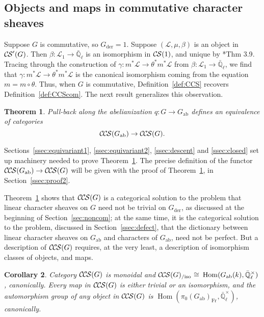 \documentclass[10pt]{amsart}
\theoremstyle{plain}
\newtheorem{theorem}{Theorem}[section]
\newtheorem{corollary}[theorem]{Corollary}
\theoremstyle{definition}
\newcommand{\EE}{\mathbb{\bar Q}_\ell}
\newcommand{\Fq}{k}
\newcommand{\EEx}{\EE^\times}
\newcommand{\Frob}[1]{\operatorname{Fr}_{#1}}
\DeclareMathOperator{\Hom}{Hom}
\newcommand{\der}{_{\operatorname{der}}}
\newcommand{\ab}{_{\operatorname{ab}}}
\newcommand{\iso}{{\ \cong\ }}
\newcommand{\cs}[1]{{\mathcal{#1}}}
\newcommand{\CS}{{\mathcal{C\hskip-0.8pt S}}}
\newcommand{\CCS}{{\mathcal{C\hskip-.8pt C\hskip-0.8pt S}}}
\newcommand{\CCSiso}[1]{\CCS(#1)_{/\text{iso}}}
\begin{document}
\subsection{Objects and maps in commutative character sheaves} \label{ssec:obmor}

Suppose $G$ is commutative, so $G\der = 1$. 
Suppose $(\cs{L},\mu,\beta)$ is an object in $\CS'(G)$.
Then $\beta : \cs{L}_1\to \EE$ is an isomorphism in $\CS(1)$, and unique by \cite{cunningham-roe:13a}*{Thm 3.9}.
Tracing through the construction of $\gamma : m^*\cs{L} \to \theta^*m^*\cs{L}$ from $\beta : \cs{L}_1\to \EE$, we find 
that $\gamma : m^*\cs{L} \to \theta^*m^*\cs{L}$ is the canonical isomorphism coming from the equation $m = m \circ \theta$. 
Thus, when $G$ is commutative, Definition~\ref{def:CCS} recovers Definition~\ref{def:CCScom}.
The next result generalizes this observation.


\begin{theorem}\label{thm:Gab}
Pull-back along the abelianization $q : G \to G\ab$
defines an equivalence of categories
\[
\CCS(G\ab) \to \CCS(G).
\]
\end{theorem}
%
Sections~\ref{ssec:equivariant1}, \ref{ssec:equivariant2}, \ref{ssec:descent} and \ref{ssec:closed} set up machinery needed to prove Theorem~\ref{thm:Gab}.
The precise definition of the functor $\CCS(G\ab) \to \CCS(G)$ will be given with the proof of Theorem~\ref{thm:Gab}, in Section~\ref{ssec:proof2}.

Theorem~\ref{thm:Gab} shows that $\CCS(G)$ is a categorical solution to the problem that linear character sheaves on $G$ need not be trivial on $G\der$, as discussed at the beginning of Section~\ref{sec:noncom}; at the same time, it is the categorical solution to the problem, discussed in Section~\ref{ssec:defect}, that the dictionary between linear character sheaves on $G\ab$ and characters of $G\ab$, need not be perfect.
%
But a description of $\CCS(G)$ requires, at the very least, a description of isomorphism classes of objects, and maps. 

\begin{corollary}\label{cor:Gab}
Category $\CCS(G)$ is monoidal and $\CCSiso{G} \iso \Hom(G\ab(\Fq),\EEx)$, canonically.
Every map in $\CCS(G)$ is either trivial or an isomorphism, and the automorphism group of any object in $\CCS(G)$ is $\Hom(\pi_0(G\ab)_{\Frob{}},\EEx)$, canonically.
\end{corollary}
\end{document}
